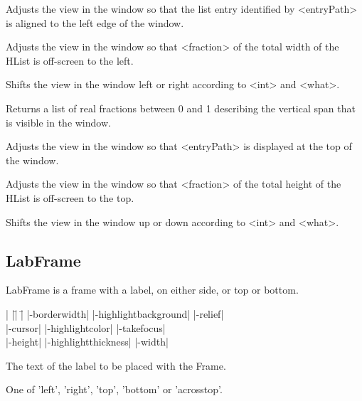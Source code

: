 \begin{enum}{1cm}
Adjusts the view in the window so that the list entry identified by <entryPath> is aligned to the left edge of the window. 

Adjusts the view in the window so that <fraction> of the total width of the HList is off-screen to the left.

Shifts the view in the window left or right according to <int> and <what>.

Returns a list of real fractions between 0 and 1 describing the vertical span that is visible in the window.

Adjusts the view in the window so that <entryPath> is displayed at the top of the window. 

Adjusts the view in the window so that <fraction> of the total height of the HList is off-screen to the top.

Shifts the view in the window up or down according to <int> and <what>.

\end{enum}

\subsection*{LabFrame}
LabFrame is a frame with a label, on either side, or top or bottom.
\vskip5pt
\vspace{-4pt}

\begin{tabbing}
|                   |\=|                     |\= \kill
|-borderwidth|      \> |-highlightbackground| \> |-relief| \\
|-cursor|           \> |-highlightcolor|      \> |-takefocus| \\
|-height|	    \> |-highlightthickness|  \> |-width| \\
\end{tabbing}

\vskip5pt
\begin{enum}{1cm}

The text of the label to be placed with the Frame.

One of 'left', 'right', 'top', 'bottom' or 'acrosstop'.

\end{enum}

